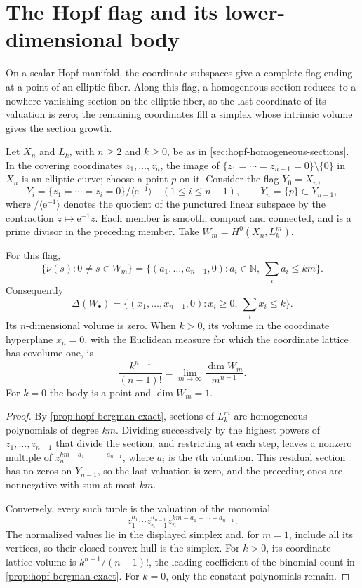 \section{The Hopf flag and its lower-dimensional body}

On a scalar Hopf manifold, the coordinate subspaces give a complete flag ending at a point of an elliptic fiber. Along this flag, a homogeneous section reduces to a nowhere-vanishing section on the elliptic fiber, so the last coordinate of its valuation is zero; the remaining coordinates fill a simplex whose intrinsic volume gives the section growth.

Let $X_n$ and $L_k$, with $n\geq2$ and $k\geq0$, be as in \cref{sec:hopf-homogeneous-sections}. In the covering coordinates $z_1,\ldots,z_n$, the image of $\{z_1=\cdots=z_{n-1}=0\}\setminus\{0\}$ in $X_n$ is an elliptic curve; choose a point $p$ on it. Consider the flag $Y_0=X_n$,
\[
 Y_i=\{z_1=\cdots=z_i=0\}/\langle \mathrm{e}^{-1}\rangle
 \quad(1\leq i\leq n-1),\qquad Y_n=\{p\}\subset Y_{n-1},
\]
where $/\langle\mathrm e^{-1}\rangle$ denotes the quotient of the punctured linear subspace by the contraction $z\mapsto\mathrm e^{-1}z$. Each member is smooth, compact and connected, and is a prime divisor in the preceding member. Take $W_m=H^0(X_n,L_k^m)$.

\begin{proposition}\label{prop:hopf-flag-simplex}
For this flag,
\[
 \{\nu(s):0\neq s\in W_m\}
 =\{(a_1,\ldots,a_{n-1},0):a_i\in\mathbb N,
                                  \ \textstyle\sum_i a_i\leq km\}.
\]
Consequently
\[
 \Delta(W_\bullet)=
 \{(x_1,\ldots,x_{n-1},0):x_i\geq0,
                                  \ \textstyle\sum_i x_i\leq k\}.
\]
Its $n$-dimensional volume is zero. When $k>0$, its volume in the coordinate hyperplane $x_n=0$, with the Euclidean measure for which the coordinate lattice has covolume one, is
\[
 \frac{k^{n-1}}{(n-1)!}
 =\lim_{m\to\infty}\frac{\dim W_m}{m^{n-1}}.
\]
For $k=0$ the body is a point and $\dim W_m=1$.
\end{proposition}
\begin{proof}
By \cref{prop:hopf-bergman-exact}, sections of $L_k^m$ are homogeneous polynomials of degree $km$. Dividing successively by the highest powers of $z_1,\ldots,z_{n-1}$ that divide the section, and restricting at each step, leaves a nonzero multiple of $z_n^{km-a_1-\cdots-a_{n-1}}$, where $a_i$ is the $i$th valuation. This residual section has no zeros on $Y_{n-1}$, so the last valuation is zero, and the preceding ones are nonnegative with sum at most $km$.

Conversely, every such tuple is the valuation of the monomial
\[
 z_1^{a_1}\cdots z_{n-1}^{a_{n-1}}
 z_n^{km-a_1-\cdots-a_{n-1}}.
\]
The normalized values lie in the displayed simplex and, for $m=1$, include all its vertices, so their closed convex hull is the simplex. For $k>0$, its coordinate-lattice volume is $k^{n-1}/(n-1)!$, the leading coefficient of the binomial count in \cref{prop:hopf-bergman-exact}. For $k=0$, only the constant polynomials remain.
\end{proof}

